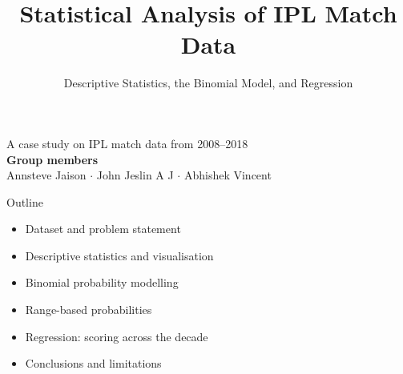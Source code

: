 \documentclass[aspectratio=169]{beamer}
\title{Statistical Analysis of IPL Match Data}
\subtitle{Descriptive Statistics, the Binomial Model, and Regression}
\institute{Rajagiri College of Social Sciences (Autonomous)}
\date{}
\begin{document}
\begin{frame}[plain]
\titlepage
\begin{center}
\small A case study on IPL match data from 2008--2018\\[0.7em]
\normalsize\textbf{Group members}\\[0.3em]
Annsteve Jaison \quad $\cdot$ \quad John Jeslin A J \quad $\cdot$ \quad Abhishek Vincent
\end{center}
\end{frame}

\begin{frame}{Outline}
\begin{itemize}
\setlength\itemsep{0.6em}
\item Dataset and problem statement
\item Descriptive statistics and visualisation
\item Binomial probability modelling
\item Range-based probabilities
\item Regression: scoring across the decade
\item Conclusions and limitations
\end{itemize}
\end{frame}
\end{document}
